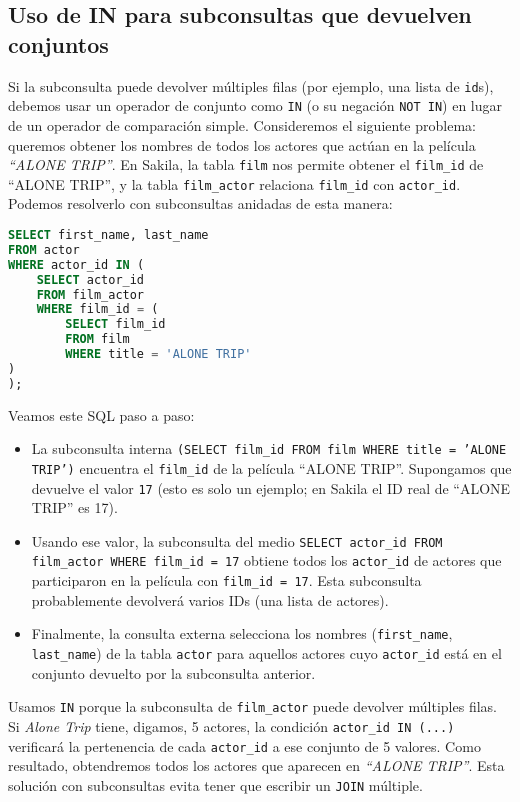 \documentclass[12pt,a4paper]{article}
\begin{document}
\subsection*{Uso de IN para subconsultas que devuelven conjuntos} 

Si la subconsulta puede devolver múltiples filas (por ejemplo, una lista de \texttt{id}s), debemos usar un operador de conjunto como \texttt{IN} (o su negación \texttt{NOT IN}) en lugar de un operador de comparación simple.
%
Consideremos el siguiente problema: queremos obtener los nombres de todos los actores que actúan en la película \textit{“ALONE TRIP”}.
%
En Sakila, la tabla \texttt{film} nos permite obtener el \texttt{film\_id} de “ALONE TRIP”, y la tabla \texttt{film\_actor} relaciona \texttt{film\_id} con \texttt{actor\_id}.
%
Podemos resolverlo con subconsultas anidadas de esta manera: 


\begin{lstlisting}[language=SQL]
SELECT first_name, last_name
FROM actor
WHERE actor_id IN (
	SELECT actor_id
	FROM film_actor
	WHERE film_id = (
		SELECT film_id
		FROM film
		WHERE title = 'ALONE TRIP'
)
);
\end{lstlisting}


Veamos este SQL paso a paso:



\begin{itemize}
\item La subconsulta interna \texttt{(SELECT film\_id FROM film WHERE title = 'ALONE TRIP')} encuentra el \texttt{film\_id} de la película “ALONE TRIP”.
%
Supongamos que devuelve el valor \texttt{17} (esto es solo un ejemplo; en Sakila el ID real de “ALONE TRIP” es 17).
\item Usando ese valor, la subconsulta del medio \texttt{SELECT actor\_id FROM film\_actor WHERE film\_id = 17} obtiene todos los \texttt{actor\_id} de actores que participaron en la película con \texttt{film\_id = 17}.
%
Esta subconsulta probablemente devolverá varios IDs (una lista de actores).
\item Finalmente, la consulta externa selecciona los nombres (\texttt{first\_name}, \texttt{last\_name}) de la tabla \texttt{actor} para aquellos actores cuyo \texttt{actor\_id} está en el conjunto devuelto por la subconsulta anterior.
\end{itemize} 

Usamos \texttt{IN} porque la subconsulta de \texttt{film\_actor} puede devolver múltiples filas.
%
Si \textit{Alone Trip} tiene, digamos, 5 actores, la condición \texttt{actor\_id IN (...)} verificará la pertenencia de cada \texttt{actor\_id} a ese conjunto de 5 valores.
%
Como resultado, obtendremos todos los actores que aparecen en \textit{“ALONE TRIP”}.
%
Esta solución con subconsultas evita tener que escribir un \texttt{JOIN} múltiple.
\end{document}
